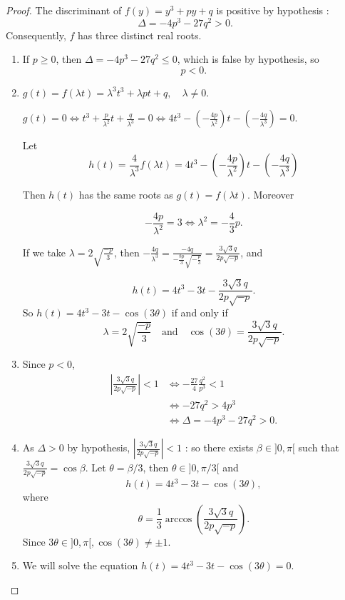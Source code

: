 \documentclass[11pt,a4paper]{article}
\begin{document}
\begin{proof}
The discriminant of $f(y) = y^3+py+q$ is positive by hypothesis :
$$\Delta = -4p^3-27q^2>0.$$
Consequently, $f$ has three distinct real roots.
\begin{enumerate}
\item[(a)] 
If $p\geq 0$, then $\Delta =-4p^3-27q^2\leq 0$, which is false by hypothesis, so
$$p<0.$$

\item[(b)]
$g(t) = f(\lambda t) = \lambda^3t^3+\lambda pt + q, \quad \lambda \neq 0$.

$g(t) = 0 \iff  t^3 + \frac{p}{\lambda^2} t + \frac{q}{\lambda^3}=0 \iff  4t^3 -\left(-\frac{4p}{\lambda^2}\right) t - \left(-\frac{4q}{\lambda^3}\right)=0$.

Let $$h(t) = \frac{4}{\lambda^3} f(\lambda t) = 4t^3 -\left(-\frac{4p}{\lambda^2}\right) t - \left(-\frac{4q}{\lambda^3}\right)$$

Then $h(t)$ has the same roots as $g(t) = f(\lambda t)$. Moreover

$$-\frac{4p}{\lambda^2} = 3 \iff \lambda^2 = -\frac{4}{3} p.$$

If we take $\lambda = 2\sqrt{\frac{-p}{3}}$, then $-\frac{4q}{\lambda^3} = \frac{-4q}{-\frac{8p}{3}\sqrt{-\frac{p}{3}}} = \frac{3\sqrt{3}q}{2p\sqrt{-p}}$, and

 $$h(t) = 4t^3 -3t-\frac{3\sqrt{3}q}{2p\sqrt{-p}}.$$
So $h(t) = 4t^3 -3t - \cos(3\theta)$  if and only if
$$\lambda = 2 \sqrt{\frac{-p}{3}}\quad \mathrm{and}\quad  \cos(3\theta) = \frac{3\sqrt{3}q}{2p\sqrt{-p}}.$$
\item[(c)] Since $p<0$, 
 \begin{align*}
\left \vert \frac{3\sqrt{3}q}{2p\sqrt{-p}}  \right \vert <1 &\iff  -\frac{27}{4} \frac{q^2}{p^3} < 1\\
&\iff -27q^2 > 4p^3 \\
&\iff \Delta = -4p^3-27q^2>0.
\end{align*}

\item[(d)]
As $\Delta > 0$ by hypothesis, $ \left \vert \frac{3\sqrt{3}q}{2p\sqrt{-p}}  \right \vert <1$ : so there exists  $\beta \in ]0,\pi[$ such that $ \frac{3\sqrt{3}q}{2p\sqrt{-p}} = \cos \beta$.
Let $\theta = \beta/3$, then $\theta \in ]0,\pi/3[$ and
$$h(t) = 4t^3 - 3t -\cos(3\theta), $$
where
$$\theta = \frac{1}{3}\arccos\left(\frac{3\sqrt{3}q}{2p\sqrt{-p}} \right).$$
Since $3 \theta \in ]0,\pi[, \cos(3\theta) \neq\pm1$.

\item[(e)] We will solve the equation $h(t) = 4t^3 - 3t -\cos(3\theta)=0$.


\end{enumerate}
\end{proof}
\end{document}

